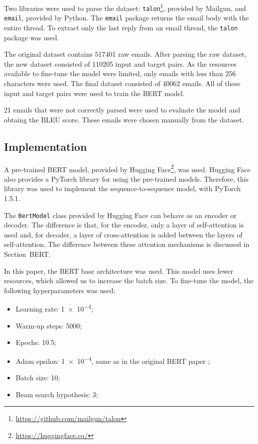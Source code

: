 \documentclass[letterpaper]{article}
\begin{document}
Two libraries were used to parse the dataset: \texttt{talon}\footnote{\href{https://github.com/mailgun/talon}{https://github.com/mailgun/talon}}, provided by Mailgun, and \texttt{email}, provided by Python. The \texttt{email} package returns the email body with the entire thread. To extract only the last reply from an email thread, the \texttt{talon} package was used.

The original dataset contains \num{517401} raw emails. After parsing the raw dataset, the new dataset consisted of \num{110205} input and target pairs. As the resources available to fine-tune the model were limited,  only emails with less than \num{256} characters were used. The final dataset consisted of \num{40062} emails. All of these input and target pairs were used to train the BERT model.

\num{21} emails that were not correctly parsed were used to evaluate the model and obtaing the BLEU score. These emails were chosen manually from the dataset.

\subsection{Implementation}

A pre-trained BERT model, provided by Hugging Face\footnote{\href{https://huggingface.co/}{https://huggingface.co/}}, was used. Hugging Face also provides a PyTorch library for using the pre-trained models. Therefore, this library was used to implement the sequence-to-sequence model, with PyTorch 1.5.1.

The \texttt{BertModel} class provided by Hugging Face can behave as an encoder or decoder. The difference is that, for the encoder, only a layer of self-attention is used and, for decoder, a layer of cross-attention is added between the layers of self-attention. The difference between these attention mechanisms is discussed in Section~BERT.

In this paper, the BERT base architecture was used. This model uses fewer resources, which allowed us to increase the batch size. To fine-tune the model, the following hyperparameters was used:

\begin{itemize}
    \item Learning rate: \num{1e-4};
    \item Warm-up steps: \num{5000};
    \item Epochs: \num{10.5};
    \item Adam epsilon: \num{1e-4}, same as in the original BERT paper \cite{DBLP:journals/corr/abs-1810-04805};
    \item Batch size: \num{10};
    \item Beam search hypothesis: \num{3};
\end{itemize}
\end{document}
